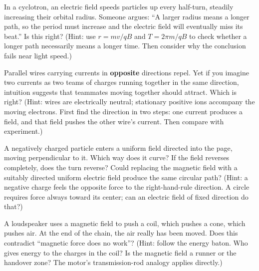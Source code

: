 \begin{puzzles}
  \item In a cyclotron, an electric field speeds particles up every half-turn, steadily increasing their orbital radius. Someone argues: ``A larger radius means a longer path, so the period must increase and the electric field will eventually miss its beat.'' Is this right? (Hint: use \(r=mv/qB\) and \(T=2\pi m/qB\) to check whether a longer path necessarily means a longer time. Then consider why the conclusion fails near light speed.)
  \item Parallel wires carrying currents in \textbf{opposite} directions repel. Yet if you imagine two currents as two teams of charges running together in the same direction, intuition suggests that teammates moving together should attract. Which is right? (Hint: wires are electrically neutral; stationary positive ions accompany the moving electrons. First find the direction in two steps: one current produces a field, and that field pushes the other wire's current. Then compare with experiment.)
  \item A negatively charged particle enters a uniform field directed into the page, moving perpendicular to it. Which way does it curve? If the field reverses completely, does the turn reverse? Could replacing the magnetic field with a suitably directed uniform electric field produce the same circular path? (Hint: a negative charge feels the opposite force to the right-hand-rule direction. A circle requires force always toward its center; can an electric field of fixed direction do that?)
  \item A loudspeaker uses a magnetic field to push a coil, which pushes a cone, which pushes air. At the end of the chain, the air really has been moved. Does this contradict ``magnetic force does no work''? (Hint: follow the energy baton. Who gives energy to the charges in the coil? Is the magnetic field a runner or the handover zone? The motor's transmission-rod analogy applies directly.)
\end{puzzles}
